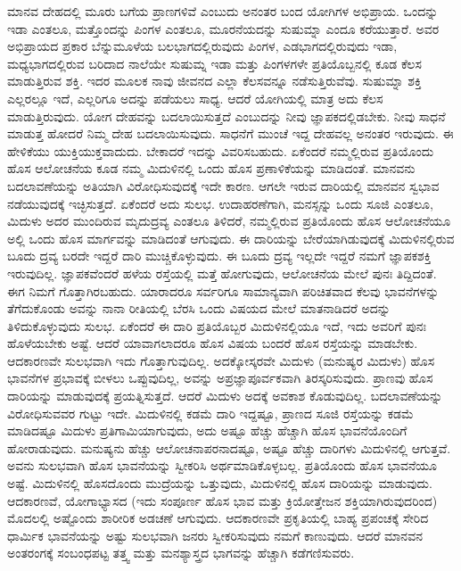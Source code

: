 ಮಾನವ ದೇಹದಲ್ಲಿ ಮೂರು ಬಗೆಯ ಪ್ರಾಣಗಳಿವೆ ಎಂಬುದು ಅನಂತರ ಬಂದ ಯೋಗಿಗಳ ಅಭಿಪ್ರಾಯ. ಒಂದನ್ನು ಇಡಾ ಎಂತಲೂ, ಮತ್ತೊಂದನ್ನು ಪಿಂಗಳ ಎಂತಲೂ, ಮೂರನೆಯದನ್ನು ಸುಷುಮ್ನಾ ಎಂದೂ ಕರೆಯುತ್ತಾರೆ. ಅವರ ಅಭಿಪ್ರಾಯದ ಪ್ರಕಾರ ಬೆನ್ನುಮೂಳೆಯ ಬಲಭಾಗದಲ್ಲಿರುವುದು ಪಿಂಗಳ, ಎಡಭಾಗದಲ್ಲಿರುವುದು ಇಡಾ, ಮಧ್ಯಭಾಗದಲ್ಲಿರುವ ಬರಿದಾದ ನಾಲೆಯೇ ಸುಷುಮ್ನ ಇಡಾ ಮತ್ತು ಪಿಂಗಳಗಳೇ ಪ್ರತಿಯೊಬ್ಬನಲ್ಲಿ ಕೂಡ ಕೆಲಸ ಮಾಡುತ್ತಿರುವ ಶಕ್ತಿ. ಇದರ ಮೂಲಕ ನಾವು ಜೀವನದ ಎಲ್ಲಾ ಕೆಲಸವನ್ನೂ ನಡೆಸುತ್ತಿರುವೆವು. ಸುಷುಮ್ನಾ ಶಕ್ತಿ ಎಲ್ಲರಲ್ಲೂ ಇದೆ, ಎಲ್ಲರಿಗೂ ಅದನ್ನು ಪಡೆಯಲು ಸಾಧ್ಯ. ಆದರೆ ಯೋಗಿಯಲ್ಲಿ ಮಾತ್ರ ಅದು ಕೆಲಸ ಮಾಡುತ್ತಿರುವುದು. ಯೋಗ ದೇಹವನ್ನು ಬದಲಾಯಿಸುತ್ತದೆ ಎಂಬುದನ್ನು ನೀವು ಜ್ಞಾಪಕದಲ್ಲಿಡಬೇಕು. ನೀವು ಸಾಧನೆ ಮಾಡುತ್ತ ಹೋದರೆ ನಿಮ್ಮ ದೇಹ ಬದಲಾಯಿಸುವುದು. ಸಾಧನೆಗೆ ಮುಂಚೆ ಇದ್ದ ದೇಹವಲ್ಲ ಅನಂತರ ಇರುವುದು. ಈ ಹೇಳಿಕೆಯು ಯುಕ್ತಿಯುಕ್ತವಾದುದು. ಬೇಕಾದರೆ ಇದನ್ನು ವಿವರಿಸಬಹುದು. ಏಕೆಂದರೆ ನಮ್ಮಲ್ಲಿರುವ ಪ್ರತಿಯೊಂದು ಹೊಸ ಆಲೋಚನೆಯ ಕೂಡ ನಮ್ಮ ಮಿದುಳಿನಲ್ಲಿ ಒಂದು ಹೊಸ ಪ್ರಣಾಳಿಕೆಯನ್ನು ಮಾಡಿದಂತೆ. ಮಾನವನು ಬದಲಾವಣೆಯನ್ನು ಅತಿಯಾಗಿ ವಿರೋಧಿಸುವುದಕ್ಕೆ ಇದೇ ಕಾರಣ. ಆಗಲೇ ಇರುವ ದಾರಿಯಲ್ಲಿ ಮಾನವನ ಸ್ವಭಾವ ನಡೆಯುವುದಕ್ಕೆ ಇಚ್ಛಿಸುತ್ತದೆ. ಏಕೆಂದರೆ ಅದು ಸುಲಭ. ಉದಾಹರಣೆಗಾಗಿ, ಮನಸ್ಸನ್ನು ಒಂದು ಸೂಜಿ ಎಂತಲೂ, ಮಿದುಳು ಅದರ ಮುಂದಿರುವ ಮೃದುದ್ರವ್ಯ ಎಂತಲೂ ತಿಳಿದರೆ, ನಮ್ಮಲ್ಲಿರುವ ಪ್ರತಿಯೊಂದು ಹೊಸ ಆಲೋಚನೆಯೂ ಅಲ್ಲಿ ಒಂದು ಹೊಸ ಮಾರ್ಗವನ್ನು ಮಾಡಿದಂತೆ ಆಗುವುದು. ಈ ದಾರಿಯನ್ನು ಬೇರೆಯಾಗಿಡುವುದಕ್ಕೆ ಮಿದುಳಿನಲ್ಲಿರುವ ಬೂದು ದ್ರವ್ಯ  ಬರದೇ ಇದ್ದರೆ ದಾರಿ ಮುಚ್ಚಿಕೊಳ್ಳುವುದು. ಈ ಬೂದು ದ್ರವ್ಯ ಇಲ್ಲದೇ ಇದ್ದರೆ ನಮಗೆ ಜ್ಞಾಪಕಶಕ್ತಿ ಇರುವುದಿಲ್ಲ. ಜ್ಞಾಪಕವೆಂದರೆ ಹಳೆಯ ರಸ್ತೆಯಲ್ಲಿ ಮತ್ತೆ ಹೋಗುವುದು, ಆಲೋಚನೆಯ ಮೇಲೆ ಪುನಃ ತಿದ್ದಿದಂತೆ. ಈಗ ನಿಮಗೆ ಗೊತ್ತಾಗಿರಬಹುದು. ಯಾರಾದರೂ ಸರ್ವರಿಗೂ ಸಾಮಾನ್ಯವಾಗಿ ಪರಿಚಿತವಾದ ಕೆಲವು ಭಾವನೆಗಳನ್ನು ತೆಗೆದುಕೊಂಡು ಅವನ್ನು ನಾನಾ ರೀತಿಯಲ್ಲಿ ಬೆರಸಿ ಒಂದು ವಿಷಯದ ಮೇಲೆ ಮಾತನಾಡಿದರೆ ಅದನ್ನು ತಿಳಿದುಕೊಳ್ಳುವುದು ಸುಲಭ. ಏಕೆಂದರೆ ಈ ದಾರಿ ಪ್ರತಿಯೊಬ್ಬರ ಮಿದುಳಿನಲ್ಲಿಯೂ ಇದೆ, ಇದು ಅವರಿಗೆ ಪುನಃ ಹೊಳೆಯಬೇಕು ಅಷ್ಟೆ. ಆದರೆ ಯಾವಾಗಲಾದರೂ ಹೊಸ ವಿಷಯ ಬಂದರೆ ಹೊಸ ರಸ್ತೆಯನ್ನು ಮಾಡಬೇಕು. ಆದಕಾರಣವೇ ಸುಲಭವಾಗಿ ಇದು ಗೊತ್ತಾಗುವುದಿಲ್ಲ. ಅದಕ್ಕೋಸ್ಕರವೇ ಮಿದುಳು (ಮನುಷ್ಯರ ಮಿದುಳು) ಹೊಸ ಭಾವನೆಗಳ ಪ್ರಭಾವಕ್ಕೆ ಬೀಳಲು ಒಪ್ಪುವುದಿಲ್ಲ, ಅವನ್ನು ಅಪ್ರಜ್ಞಾಪೂರ್ವಕವಾಗಿ ತಿರಸ್ಕರಿಸುವುದು. ಪ್ರಾಣವು ಹೊಸ ದಾರಿಯನ್ನು ಮಾಡುವುದಕ್ಕೆ ಪ್ರಯತ್ನಿಸುತ್ತದೆ. ಆದರೆ ಮಿದುಳು ಅದಕ್ಕೆ ಅವಕಾಶ ಕೊಡುವುದಿಲ್ಲ. ಬದಲಾವಣೆಯನ್ನು ವಿರೋಧಿಸುವವರ ಗುಟ್ಟು ಇದೇ. ಮಿದುಳಿನಲ್ಲಿ ಕಡಮೆ ದಾರಿ ಇದ್ದಷ್ಟೂ, ಪ್ರಾಣದ ಸೂಜಿ ರಸ್ತೆಯನ್ನು ಕಡಮೆ ಮಾಡಿದಷ್ಟೂ ಮಿದುಳು ಪ್ರತಿಗಾಮಿಯಾಗುವುದು, ಅದು ಅಷ್ಟೂ ಹೆಚ್ಚು ಹೆಚ್ಚಾಗಿ ಹೊಸ ಭಾವನೆಯೊಂದಿಗೆ ಹೋರಾಡುವುದು. ಮನುಷ್ಯನು ಹೆಚ್ಚು ಆಲೋಚನಾಪರನಾದಷ್ಟೂ, ಅಷ್ಟೂ ಹೆಚ್ಚು ದಾರಿಗಳು ಮಿದುಳಿನಲ್ಲಿ ಆಗುತ್ತವೆ. ಅವನು ಸುಲಭವಾಗಿ ಹೊಸ ಭಾವನೆಯನ್ನು ಸ್ವೀಕರಿಸಿ ಅರ್ಥಮಾಡಿಕೊಳ್ಳಬಲ್ಲ. ಪ್ರತಿಯೊಂದು ಹೊಸ ಭಾವನೆಯೂ ಅಷ್ಟೆ. ಮಿದುಳಿನಲ್ಲಿ ಹೊಸದೊಂದು ಮುದ್ರೆಯನ್ನು ಒತ್ತುವುದು, ಮಿದುಳಿನಲ್ಲಿ ಹೊಸ ದಾರಿಯನ್ನು ಮಾಡುವುದು. ಆದಕಾರಣವೆ, ಯೋಗಾಭ್ಯಾಸದ (ಇದು ಸಂಪೂರ್ಣ ಹೊಸ ಭಾವ ಮತ್ತು ಕ್ರಿಯೋತ್ತೇಜನ ಶಕ್ತಿಯಾಗಿರುವುದರಿಂದ) ಮೊದಲಲ್ಲಿ ಅಷ್ಟೊಂದು ಶಾರೀರಿಕ ಅಡಚಣೆ ಆಗುವುದು. ಆದಕಾರಣವೇ ಪ್ರಕೃತಿಯಲ್ಲಿ ಬಾಹ್ಯ ಪ್ರಪಂಚಕ್ಕೆ ಸೇರಿದ ಧಾರ್ಮಿಕ ಭಾವನೆಯನ್ನು ಅಷ್ಟು ಸುಲಭವಾಗಿ ಜನರು ಸ್ವೀಕರಿಸುವುದು ನಮಗೆ ಕಾಣುವುದು. ಆದರೆ ಮಾನವನ ಅಂತರಂಗಕ್ಕೆ ಸಂಬಂಧಪಟ್ಟ ತತ್ತ್ವ ಮತ್ತು ಮನಶ್ಯಾಸ್ತ್ರದ ಭಾಗವನ್ನು ಹೆಚ್ಚಾಗಿ ಕಡೆಗಣಿಸುವರು. 


